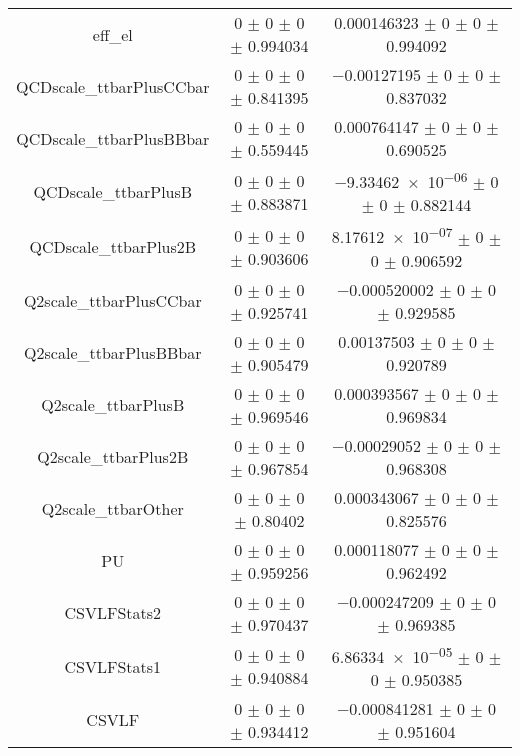 \begin{table}
\begin{tabular}{ccc}
eff\_el 	& \num{0} $\pm$ \num{0} $\pm$ \num{0} $\pm$ \num{0.994034} 	& \num{0.000146323} $\pm$ \num{0} $\pm$ \num{0} $\pm$ \num{0.994092}\\
QCDscale\_ttbarPlusCCbar 	& \num{0} $\pm$ \num{0} $\pm$ \num{0} $\pm$ \num{0.841395} 	& \num{-0.00127195} $\pm$ \num{0} $\pm$ \num{0} $\pm$ \num{0.837032}\\
QCDscale\_ttbarPlusBBbar 	& \num{0} $\pm$ \num{0} $\pm$ \num{0} $\pm$ \num{0.559445} 	& \num{0.000764147} $\pm$ \num{0} $\pm$ \num{0} $\pm$ \num{0.690525}\\
QCDscale\_ttbarPlusB 	& \num{0} $\pm$ \num{0} $\pm$ \num{0} $\pm$ \num{0.883871} 	& \num{-9.33462e-06} $\pm$ \num{0} $\pm$ \num{0} $\pm$ \num{0.882144}\\
QCDscale\_ttbarPlus2B 	& \num{0} $\pm$ \num{0} $\pm$ \num{0} $\pm$ \num{0.903606} 	& \num{8.17612e-07} $\pm$ \num{0} $\pm$ \num{0} $\pm$ \num{0.906592}\\
Q2scale\_ttbarPlusCCbar 	& \num{0} $\pm$ \num{0} $\pm$ \num{0} $\pm$ \num{0.925741} 	& \num{-0.000520002} $\pm$ \num{0} $\pm$ \num{0} $\pm$ \num{0.929585}\\
Q2scale\_ttbarPlusBBbar 	& \num{0} $\pm$ \num{0} $\pm$ \num{0} $\pm$ \num{0.905479} 	& \num{0.00137503} $\pm$ \num{0} $\pm$ \num{0} $\pm$ \num{0.920789}\\
Q2scale\_ttbarPlusB 	& \num{0} $\pm$ \num{0} $\pm$ \num{0} $\pm$ \num{0.969546} 	& \num{0.000393567} $\pm$ \num{0} $\pm$ \num{0} $\pm$ \num{0.969834}\\
Q2scale\_ttbarPlus2B 	& \num{0} $\pm$ \num{0} $\pm$ \num{0} $\pm$ \num{0.967854} 	& \num{-0.00029052} $\pm$ \num{0} $\pm$ \num{0} $\pm$ \num{0.968308}\\
Q2scale\_ttbarOther 	& \num{0} $\pm$ \num{0} $\pm$ \num{0} $\pm$ \num{0.80402} 	& \num{0.000343067} $\pm$ \num{0} $\pm$ \num{0} $\pm$ \num{0.825576}\\
PU 	& \num{0} $\pm$ \num{0} $\pm$ \num{0} $\pm$ \num{0.959256} 	& \num{0.000118077} $\pm$ \num{0} $\pm$ \num{0} $\pm$ \num{0.962492}\\
CSVLFStats2 	& \num{0} $\pm$ \num{0} $\pm$ \num{0} $\pm$ \num{0.970437} 	& \num{-0.000247209} $\pm$ \num{0} $\pm$ \num{0} $\pm$ \num{0.969385}\\
CSVLFStats1 	& \num{0} $\pm$ \num{0} $\pm$ \num{0} $\pm$ \num{0.940884} 	& \num{6.86334e-05} $\pm$ \num{0} $\pm$ \num{0} $\pm$ \num{0.950385}\\
CSVLF 	& \num{0} $\pm$ \num{0} $\pm$ \num{0} $\pm$ \num{0.934412} 	& \num{-0.000841281} $\pm$ \num{0} $\pm$ \num{0} $\pm$ \num{0.951604}\\

\end{tabular}
\end{table}

